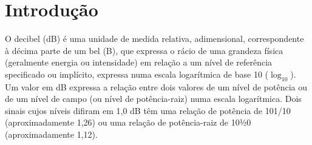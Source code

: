 \section{Introdução}

O decibel (dB) é uma unidade de medida relativa, adimensional, 
correspondente à décima parte de um bel (B), que expressa o rácio de uma grandeza 
física (geralmente energia ou intensidade) em relação a um nível de referência 
specificado ou implícito, expressa numa escala logarítmica de base 10 ($\log_{10}$). 
Um valor em dB expressa a relação entre dois valores de um nível de potência ou de um 
nível de campo (ou nível de potência-raiz) numa escala logarítmica. 
Dois sinais cujos níveis difiram em 1,0 dB têm uma relação 
de potência de 101/10 (aproximadamente 1,26) ou uma relação 
de potência-raiz de 101⁄20 (aproximadamente 1,12).